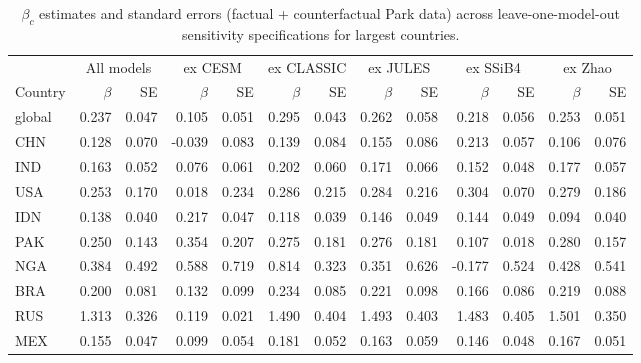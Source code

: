 \begin{table}[ht]
\centering
\caption{$\beta_c$ estimates and standard errors (factual + counterfactual Park data) across leave-one-model-out sensitivity specifications for largest countries.} 
\label{tab:beta_fact_cfact}
\begin{tabular}{lrrrrrrrrrrrr}
  \toprule
   & \multicolumn{2}{c}{All models} & \multicolumn{2}{c}{ex CESM} & \multicolumn{2}{c}{ex CLASSIC} & \multicolumn{2}{c}{ex JULES} & \multicolumn{2}{c}{ex SSiB4} & \multicolumn{2}{c}{ex Zhao} \\
\cmidrule(lr){2-3}\cmidrule(lr){4-5}\cmidrule(lr){6-7}\cmidrule(lr){8-9}\cmidrule(lr){10-11}\cmidrule(lr){12-13}
Country & $\beta$ & SE & $\beta$ & SE & $\beta$ & SE & $\beta$ & SE & $\beta$ & SE & $\beta$ & SE \\
\midrule
 \midrule
global & 0.237 & 0.047 & 0.105 & 0.051 & 0.295 & 0.043 & 0.262 & 0.058 & 0.218 & 0.056 & 0.253 & 0.051 \\ 
  CHN & 0.128 & 0.070 & -0.039 & 0.083 & 0.139 & 0.084 & 0.155 & 0.086 & 0.213 & 0.057 & 0.106 & 0.076 \\ 
  IND & 0.163 & 0.052 & 0.076 & 0.061 & 0.202 & 0.060 & 0.171 & 0.066 & 0.152 & 0.048 & 0.177 & 0.057 \\ 
  USA & 0.253 & 0.170 & 0.018 & 0.234 & 0.286 & 0.215 & 0.284 & 0.216 & 0.304 & 0.070 & 0.279 & 0.186 \\ 
  IDN & 0.138 & 0.040 & 0.217 & 0.047 & 0.118 & 0.039 & 0.146 & 0.049 & 0.144 & 0.049 & 0.094 & 0.040 \\ 
  PAK & 0.250 & 0.143 & 0.354 & 0.207 & 0.275 & 0.181 & 0.276 & 0.181 & 0.107 & 0.018 & 0.280 & 0.157 \\ 
  NGA & 0.384 & 0.492 & 0.588 & 0.719 & 0.814 & 0.323 & 0.351 & 0.626 & -0.177 & 0.524 & 0.428 & 0.541 \\ 
  BRA & 0.200 & 0.081 & 0.132 & 0.099 & 0.234 & 0.085 & 0.221 & 0.098 & 0.166 & 0.086 & 0.219 & 0.088 \\ 
  RUS & 1.313 & 0.326 & 0.119 & 0.021 & 1.490 & 0.404 & 1.493 & 0.403 & 1.483 & 0.405 & 1.501 & 0.350 \\ 
  MEX & 0.155 & 0.047 & 0.099 & 0.054 & 0.181 & 0.052 & 0.163 & 0.059 & 0.146 & 0.048 & 0.167 & 0.051 \\ 
   \bottomrule
\end{tabular}
\end{table}
